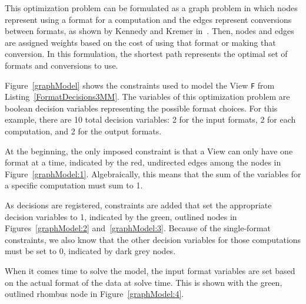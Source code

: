 This optimization problem can be formulated as a graph problem in which nodes represent using a format for a computation and the edges represent conversions between formats, as shown by Kennedy and Kremer in~\cite{kennedy1998automatic}.
Then, nodes and edges are assigned weights based on the cost of using that format or making that conversion. 
In this formulation, the shortest path represents the optimal set of formats and conversions to use.

Figure~\ref{graphModel} shows the constraints used to model the View \verb.F. from Listing~\ref{FormatDecisions3MM}.
The variables of this optimization problem are boolean decision variables representing the possible format choices. 
For this example, there are 10 total decision variables: 2 for the input formats, 2 for each computation, and 2 for the output formats.

At the beginning, the only imposed constraint is that a View can only have one format at a time, indicated by the red, undirected edges among the nodes in Figure~\ref{graphModel:1}.
Algebraically, this means that the sum of the variables for a specific computation must sum to 1. 

As decisions are registered, constraints are added that set the appropriate decision variables to 1, indicated by the green, outlined nodes in Figures~\ref{graphModel:2} and~\ref{graphModel:3}. 
Because of the single-format constraints, we also know that the other decision variables for those computations must be set to 0, indicated by dark grey nodes.

When it comes time to solve the model, the input format variables are set based on the actual format of the data at solve time. This is shown with the green, outlined rhombus node in Figure~\ref{graphModel:4}.




